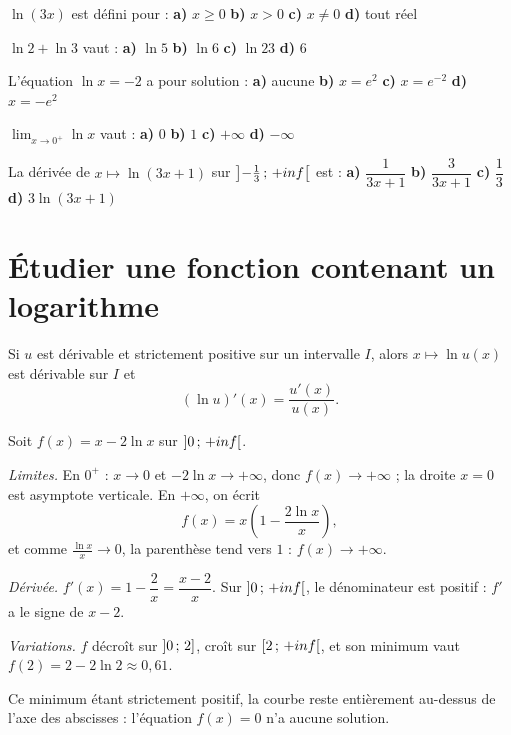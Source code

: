 \begin{qcm}
\exo $\ln(3x)$ est défini pour :
\textbf{a)} $x \geq 0$ \quad \textbf{b)} $x>0$ \quad \textbf{c)} $x \neq 0$
\quad \textbf{d)} tout réel 

\exo $\ln 2+\ln 3$ vaut :
\textbf{a)} $\ln 5$ \quad \textbf{b)} $\ln 6$ \quad \textbf{c)} $\ln 23$
\quad \textbf{d)} $6$ 

\exo L'équation $\ln x = -2$ a pour solution :
\textbf{a)} aucune \quad \textbf{b)} $x = e^{2}$ \quad
\textbf{c)} $x = e^{-2}$ \quad \textbf{d)} $x = -e^{2}$ 

\exo $\displaystyle\lim_{x \to 0^{+}} \ln x$ vaut :
\textbf{a)} $0$ \quad \textbf{b)} $1$ \quad \textbf{c)} $+\infty$ \quad
\textbf{d)} $-\infty$ 

\exo La dérivée de $x \mapsto \ln(3x+1)$ sur
$\left]-\frac13\,;\,+inf\right[$ est :
\textbf{a)} $\dfrac{1}{3x+1}$ \quad \textbf{b)} $\dfrac{3}{3x+1}$ \quad
\textbf{c)} $\dfrac{1}{3}$ \quad \textbf{d)} $3\ln(3x+1)$ 
\end{qcm}

\section{Étudier une fonction contenant un logarithme}

\begin{propriete}[dérivée]
Si $u$ est dérivable et strictement positive sur un intervalle $I$, alors
$x \mapsto \ln u(x)$ est dérivable sur $I$ et
\[
  \left(\ln u\right)'(x) = \frac{u'(x)}{u(x)} .
\]
\end{propriete}

\begin{exemple}
Soit $f(x) = x-2\ln x$ sur $\left]0\,;\,+inf\right[$.

\emph{Limites.} En $0^{+}$ : $x \to 0$ et $-2\ln x \to +\infty$, donc
$f(x) \to +\infty$ ; la droite $x = 0$ est asymptote verticale. En
$+\infty$, on écrit
\[
  f(x) = x\left(1-\frac{2\ln x}{x}\right),
\]
et comme $\frac{\ln x}{x} \to 0$, la parenthèse tend vers $1$ :
$f(x) \to +\infty$.

\emph{Dérivée.} $f'(x) = 1-\dfrac{2}{x} = \dfrac{x-2}{x}$. Sur
$\left]0\,;\,+inf\right[$, le dénominateur est positif : $f'$ a le signe de
$x-2$.

\emph{Variations.} $f$ décroît sur $\left]0\,;\,2\right]$, croît sur
$\left[2\,;\,+inf\right[$, et son minimum vaut
$f(2) = 2-2\ln 2 \approx 0{,}61$.

Ce minimum étant strictement positif, la courbe reste entièrement au-dessus
de l'axe des abscisses : l'équation $f(x) = 0$ n'a aucune solution.
\end{exemple}


